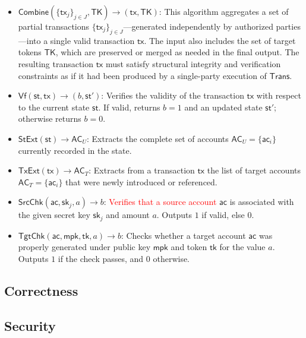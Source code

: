 \begin{definition}
\begin{itemize}
    \item $\mathsf{Combine}(\{\mathsf{tx}_j\}_{j \in J}, \mathsf{TK}) \rightarrow (\mathsf{tx}, \mathsf{TK})$:  This algorithm aggregates a set of partial transactions $\{\mathsf{tx}_j\}_{j \in J}$—generated independently by authorized parties—into a single valid transaction $\mathsf{tx}$. The input also includes the set of target tokens $\mathsf{TK}$, which are preserved or merged as needed in the final output. The resulting transaction $\mathsf{tx}$ must satisfy structural integrity and verification constraints as if it had been produced by a single-party execution of $\mathsf{Trans}$.


    \item $\mathsf{Vf}(\mathsf{st}, \mathsf{tx}) \rightarrow (b, \mathsf{st}')$: Verifies the validity of the transaction $\mathsf{tx}$ with respect to the current state $\mathsf{st}$. If valid, returns $b = 1$ and an updated state $\mathsf{st}'$; otherwise returns $b = 0$.

    \item $\mathsf{StExt}(\mathsf{st}) \rightarrow \mathsf{AC}_U$: Extracts the complete set of accounts $\mathsf{AC}_U = \{\mathsf{ac}_i\}$ currently recorded in the state.

    \item $\mathsf{TxExt}(\mathsf{tx}) \rightarrow \mathsf{AC}_T$: Extracts from a transaction $\mathsf{tx}$ the list of target accounts $\mathsf{AC}_T = \{\mathsf{ac}_i\}$ that were newly introduced or referenced.

    \item $\mathsf{SrcChk}(\mathsf{ac}, \mathsf{sk}_j, a) \rightarrow b$: \textcolor{red}{Verifies that a source account} $\mathsf{ac}$ is associated with the given secret key $\mathsf{sk}_j$ and amount $a$. Outputs $1$ if valid, else $0$.

    \item $\mathsf{TgtChk}(\mathsf{ac}, \mathsf{mpk}, \mathsf{tk}, a) \rightarrow b$: Checks whether a target account $\mathsf{ac}$ was properly generated under public key $\mathsf{mpk}$ and token $\mathsf{tk}$ for the value $a$. Outputs $1$ if the check passes, and $0$ otherwise.
\end{itemize}
\end{definition}

\subsection{Correctness}
\subsection{Security}
